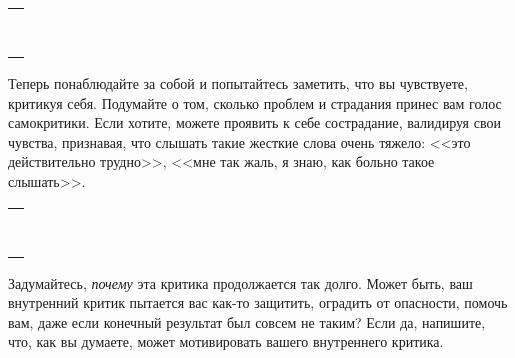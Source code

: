 \setlength{\extrarowheight}{2mm}
\begin{tabularx}{0.96\textwidth}{X}
	\\
	\arrayrulecolor{gray}\hline\\
	\hline\\
	\hline\\
	\hline\\
	\hline\\
	\hline\\	
	\hline\\
	\hline\\
	\hline\\
\end{tabularx}
\setlength{\extrarowheight}{0mm}
\begin{itemize}
	\itemWritingHand Теперь понаблюдайте за собой и попытайтесь заметить, что вы чувствуете, критикуя себя. Подумайте о том, сколько проблем и страдания принес вам голос самокритики. Если хотите, можете проявить к себе сострадание, валидируя свои чувства, признавая, что слышать такие жесткие слова очень тяжело: <<это действительно трудно>>, <<мне так жаль, я знаю, как больно такое слышать>>.
\end{itemize}

\setlength{\extrarowheight}{2mm}
\begin{tabularx}{0.96\textwidth}{X}
	\\
	\arrayrulecolor{gray}\hline\\
	\hline\\
	\hline\\
	\hline\\
	\hline\\
	\hline\\	
	\hline\\
	\hline\\
	\hline\\
\end{tabularx}
\setlength{\extrarowheight}{0mm}
\begin{itemize}
	\itemWritingHand Задумайтесь, \emph{почему} эта критика продолжается так долго. Может быть, ваш внутренний критик пытается вас как-то защитить, оградить от опасности, помочь вам, даже если конечный результат был совсем не таким? Если да, напишите, что, как вы думаете, может мотивировать вашего внутреннего критика.
\end{itemize}

